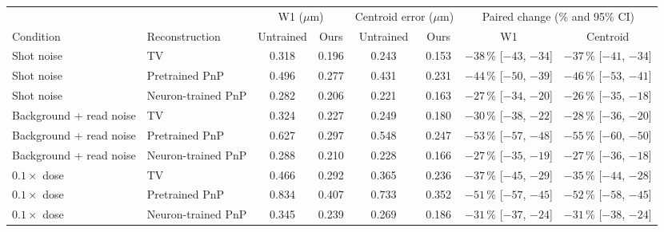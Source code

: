 \begin{tabular}{@{}llcccccc@{}}
\toprule
& & \multicolumn{2}{c}{W1 ($\mu$m)} & \multicolumn{2}{c}{Centroid error ($\mu$m)} & \multicolumn{2}{c}{Paired change (\% and 95\% CI)} \\
\cmidrule(lr){3-4}\cmidrule(lr){5-6}\cmidrule(lr){7-8}
Condition & Reconstruction & Untrained & Ours & Untrained & Ours & W1 & Centroid \\
\midrule
Shot noise & TV & 0.318 & 0.196 & 0.243 & 0.153 & $-38$\,\% [$-43$, $-34$] & $-37$\,\% [$-41$, $-34$]\\
Shot noise & Pretrained PnP & 0.496 & 0.277 & 0.431 & 0.231 & $-44$\,\% [$-50$, $-39$] & $-46$\,\% [$-53$, $-41$]\\
Shot noise & Neuron-trained PnP & 0.282 & 0.206 & 0.221 & 0.163 & $-27$\,\% [$-34$, $-20$] & $-26$\,\% [$-35$, $-18$]\\
Background + read noise & TV & 0.324 & 0.227 & 0.249 & 0.180 & $-30$\,\% [$-38$, $-22$] & $-28$\,\% [$-36$, $-20$]\\
Background + read noise & Pretrained PnP & 0.627 & 0.297 & 0.548 & 0.247 & $-53$\,\% [$-57$, $-48$] & $-55$\,\% [$-60$, $-50$]\\
Background + read noise & Neuron-trained PnP & 0.288 & 0.210 & 0.228 & 0.166 & $-27$\,\% [$-35$, $-19$] & $-27$\,\% [$-36$, $-18$]\\
$0.1\times$ dose & TV & 0.466 & 0.292 & 0.365 & 0.236 & $-37$\,\% [$-45$, $-29$] & $-35$\,\% [$-44$, $-28$]\\
$0.1\times$ dose & Pretrained PnP & 0.834 & 0.407 & 0.733 & 0.352 & $-51$\,\% [$-57$, $-45$] & $-52$\,\% [$-58$, $-45$]\\
$0.1\times$ dose & Neuron-trained PnP & 0.345 & 0.239 & 0.269 & 0.186 & $-31$\,\% [$-37$, $-24$] & $-31$\,\% [$-38$, $-24$]\\
\bottomrule
\end{tabular}
